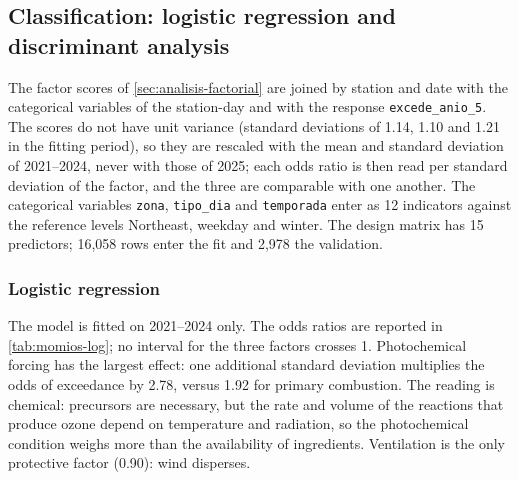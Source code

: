 \subsection{Classification: logistic regression and discriminant analysis}
\label{sec:clasificacion_tecs}

The factor scores of \cref{sec:analisis-factorial} are joined by station and
date with the categorical variables of the station-day and with the response
\texttt{excede\_anio\_5}. The scores do not have unit variance (standard
deviations of 1.14, 1.10 and 1.21 in the fitting period), so they are
rescaled with the mean and standard deviation of 2021--2024, never with those
of 2025; each odds ratio is then read per standard deviation of the factor,
and the three are comparable with one another. The categorical variables
\texttt{zona}, \texttt{tipo\_dia} and \texttt{temporada} enter as 12
indicators against the reference levels Northeast, weekday and winter. The
design matrix has 15 predictors; 16,058 rows enter the fit and 2,978 the
validation.

\subsubsection{Logistic regression}\label{sec:reg_log}

The model is fitted on 2021--2024 only. The odds ratios are reported in
\cref{tab:momios-log}; no interval for the three factors crosses 1.
Photochemical forcing has the largest effect: one additional standard
deviation multiplies the odds of exceedance by 2.78, versus 1.92 for primary
combustion. The reading is chemical: precursors are necessary, but the rate
and volume of the reactions that produce ozone depend on temperature and
radiation, so the photochemical condition weighs more than the availability
of ingredients. Ventilation is the only protective factor (0.90): wind
disperses.

